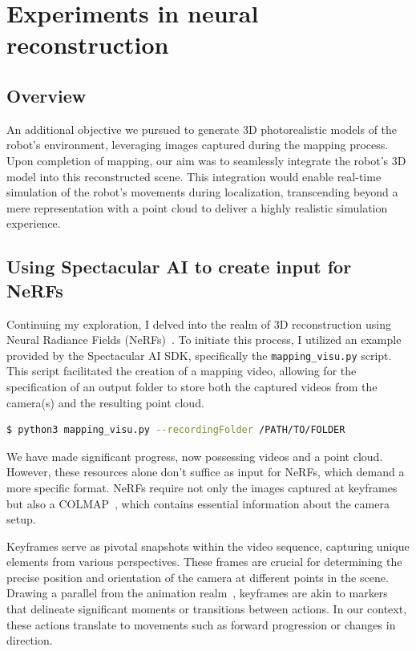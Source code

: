 \chapter{Experiments in neural reconstruction} \label{nerf_gsplat}

\section{Overview}

An additional objective we pursued to generate 3D photorealistic models of the robot's environment, leveraging images captured during the mapping process. Upon completion of mapping, our aim was to seamlessly integrate the robot's 3D model into this reconstructed scene. This integration would enable real-time simulation of the robot's movements during localization, transcending beyond a mere representation with a point cloud to deliver a highly realistic simulation experience.


\section{Using Spectacular AI to create input for NeRFs}

Continuing my exploration, I delved into the realm of 3D reconstruction using Neural Radiance Fields (NeRFs)~\cite{nerf}. To initiate this process, I utilized an example provided by the Spectacular AI SDK, specifically the \verb|mapping_visu.py| script. This script facilitated the creation of a mapping video, allowing for the specification of an output folder to store both the captured videos from the camera(s) and the resulting point cloud.

\begin{lstlisting}[language=bash,frame=single,float=!ht]
$ python3 mapping_visu.py --recordingFolder /PATH/TO/FOLDER
\end{lstlisting}

We have made significant progress, now possessing videos and a point cloud. However, these resources alone don't suffice as input for NeRFs, which demand a more specific format. NeRFs require not only the images captured at keyframes but also a COLMAP~\cite{colmap}, which contains essential information about the camera setup.

Keyframes serve as pivotal snapshots within the video sequence, capturing unique elements from various perspectives. These frames are crucial for determining the precise position and orientation of the camera at different points in the scene. Drawing a parallel from the animation realm~\cite{keyframes_in_animation}, keyframes are akin to markers that delineate significant moments or transitions between actions. In our context, these actions translate to movements such as forward progression or changes in direction.

